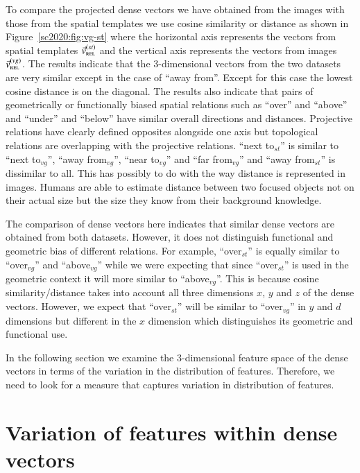 To compare the projected dense vectors we have obtained from the
images with those from the spatial templates we use cosine similarity
or distance as shown in Figure~\ref{sc2020:fig:vg-st}
where the horizontal axis represents the vectors from spatial
templates $\vec{v}_{\textsc{rel}}^{(st)}$ and the vertical axis
represents the vectors from images
$\vec{v}_{\textsc{rel}}^{(vg)}$. The results indicate that the
3-dimensional vectors from the two datasets are very similar except in
the case of ``away
from''. %
Except for this case the lowest cosine distance is on the
diagonal. The results also indicate that pairs of geometrically or
functionally biased spatial relations such as ``over'' and ``above''
and ``under'' and ``below'' have similar overall directions and
distances. Projective relations have clearly defined opposites
alongside one axis but topological relations are overlapping with the
projective relations. ``next to$_{st}$'' is similar to ``next
to$_{vg}$'', ``away from$_{vg}$'', ``near to$_{vg}$'' and ``far
from$_{vg}$'' and ``away from$_{st}$'' is dissimilar to all. This has
possibly to do with the way distance is represented in images. Humans
are able to estimate distance between two focused objects not on their
actual size but the size they know from their background knowledge.

The comparison of dense vectors here indicates that similar dense
vectors are obtained from both datasets. However, it does not
distinguish functional and geometric bias of different relations. For
example, ``over$_{st}$'' is equally similar to ``over$_{vg}$'' and
``above$_{vg}$'' while we were expecting that since ``over$_{st}$'' is
used in the geometric context it will more similar to
``above$_{vg}$''. %
This is because cosine similarity/distance takes into account all
three dimensions $x$, $y$ and $z$ of the dense vectors. However, we
expect that ``over$_{st}$'' will be similar to ``over$_{vg}$'' in $y$
and $d$ dimensions but different in the $x$ dimension which
distinguishes its geometric and functional use.

In the following section we examine the 3-dimensional feature space of
the dense vectors in terms of the variation in the distribution of
features. Therefore, we need to look for a measure that captures
variation in distribution of features.


\section{Variation of features within dense vectors}\label{sc2020:sec:variation-of-dense-vectors}

